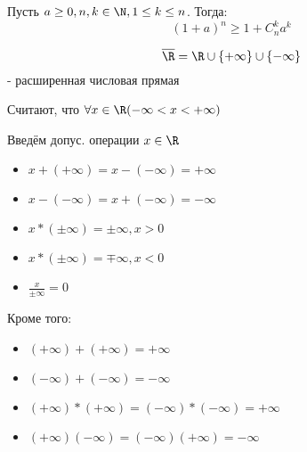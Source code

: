 \begin{consequence}
Пусть $a \geq 0, n, k \in \N, 1 \leq k \leq n$. Тогда:
\[
    (1 + a)^{n} \geq 1 + C_{n}^{k}a^{k}
\] 
\end{consequence}
\begin{symb}
\[
\overline{\R} = \R \cup \{+\infty\} \cup \{-\infty\}
\] 
- расширенная числовая прямая

\end{symb}
Считают, что $\forall x \in \R (-\infty < x < +\infty)$

Введём допус. операции $x \in \R$
\begin{itemize}
    \item $x + (+\infty) = x - (-\infty) = +\infty$
    \item $x - (-\infty) = x + (-\infty) = -\infty$
    \item $x * (\pm \infty) = \pm \infty, x > 0$
    \item $x * (\pm \infty) = \mp \infty, x < 0$
   \item $\frac{x}{\pm \infty} = 0$
\end{itemize}
Кроме того:
\begin{itemize}
    \item $(+\infty) + (+\infty) = +\infty$
    \item $(-\infty) + (-\infty) = -\infty$
    \item $(+\infty) * (+\infty) = (-\infty) * (-\infty) = +\infty$
    \item $(+\infty)(-\infty) = (-\infty)(+\infty) = -\infty$
\end{itemize}

